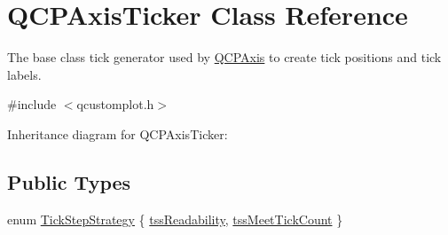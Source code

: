 \hypertarget{class_q_c_p_axis_ticker}{}\section{Q\+C\+P\+Axis\+Ticker Class Reference}
\label{class_q_c_p_axis_ticker}


The base class tick generator used by \hyperlink{class_q_c_p_axis}{Q\+C\+P\+Axis} to create tick positions and tick labels.  




{\ttfamily \#include $<$qcustomplot.\+h$>$}



Inheritance diagram for Q\+C\+P\+Axis\+Ticker\+:
\subsection*{Public Types}
\begin{DoxyCompactItemize}
\item 
enum \hyperlink{class_q_c_p_axis_ticker_ab6d2f9d9477821623ac9bc4b21ddf49a}{Tick\+Step\+Strategy} \{ \hyperlink{class_q_c_p_axis_ticker_ab6d2f9d9477821623ac9bc4b21ddf49aa9002aa2fd5633ab5556c71a26fed63a8}{tss\+Readability}, 
\hyperlink{class_q_c_p_axis_ticker_ab6d2f9d9477821623ac9bc4b21ddf49aa770312b6b9b0c64a37ceeba96e0cd7f2}{tss\+Meet\+Tick\+Count}
 \}
\end{DoxyCompactItemize}
